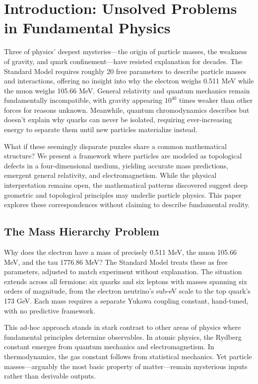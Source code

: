 \section{Introduction: Unsolved Problems in Fundamental Physics}

Three of physics' deepest mysteries---the origin of particle masses, the weakness of gravity, and quark confinement---have resisted explanation for decades. The Standard Model requires roughly 20 free parameters to describe particle masses and interactions, offering no insight into why the electron weighs 0.511 MeV while the muon weighs 105.66 MeV. General relativity and quantum mechanics remain fundamentally incompatible, with gravity appearing $10^{40}$ times weaker than other forces for reasons unknown. Meanwhile, quantum chromodynamics describes but doesn't explain why quarks can never be isolated, requiring ever-increasing energy to separate them until new particles materialize instead.

What if these seemingly disparate puzzles share a common mathematical structure? We present a framework where particles are modeled as topological defects in a four-dimensional medium, yielding accurate mass predictions, emergent general relativity, and electromagnetism. While the physical interpretation remains open, the mathematical patterns discovered suggest deep geometric and topological principles may underlie particle physics. This paper explores these correspondences without claiming to describe fundamental reality.

\subsection{The Mass Hierarchy Problem}

Why does the electron have a mass of precisely 0.511 MeV, the muon 105.66 MeV, and the tau 1776.86 MeV? The Standard Model treats these as free parameters, adjusted to match experiment without explanation. The situation extends across all fermions: six quarks and six leptons with masses spanning six orders of magnitude, from the electron neutrino's sub-eV scale to the top quark's 173 GeV. Each mass requires a separate Yukawa coupling constant, hand-tuned, with no predictive framework.

This ad-hoc approach stands in stark contrast to other areas of physics where fundamental principles determine observables. In atomic physics, the Rydberg constant emerges from quantum mechanics and electromagnetism. In thermodynamics, the gas constant follows from statistical mechanics. Yet particle masses---arguably the most basic property of matter---remain mysterious inputs rather than derivable outputs.

